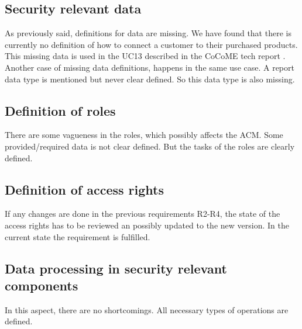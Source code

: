 \subsection{Security relevant data}
As previously said, definitions for data are missing. We have found that there is currently no definition of how to connect a customer to their purchased products. This missing data is used in the UC13 described in the CoCoME tech report \cite{CoCoMETechReport}. Another case of missing data definitions, happens in the same use case. A report data type is mentioned but never clear defined. So this data type is also missing.
\subsection{Definition of roles}
There are some vagueness in the roles, which possibly affects the ACM. Some provided/required data is not clear defined. But the tasks of the roles are clearly defined. 
\subsection{Definition of access rights}
If any changes are done in the previous requirements R2-R4, the state of the access rights has to be reviewed an possibly updated to the new version. In the current state the requirement is fulfilled.
\subsection{Data processing in security relevant components}
In this aspect, there are no shortcomings. All necessary types of operations are defined. 
